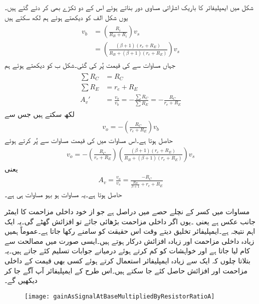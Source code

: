 شکل  میں ایمپلیفائر کا باریک اشاراتی مساوی دور بناتے ہوئے اس کے دو ٹکڑے بھی کر دئے گئے ہیں۔یوں  شکل  الف کو دیکھتے ہوئے ہم لکھ سکتے ہیں
\begin{gather}
\begin{aligned}\label{مساوات_ٹرانزسٹر_قابو_پر_برقی_دباو_کی_مساوات}
v_b&=\left(\frac{R_i}{R_B+R_i} \right) v_s\\
&=\left(\frac{\left(\beta+1 \right) \left(r_e+R_E \right)}{R_B+\left(\beta+1 \right) \left(r_e+R_E \right)} \right) v_s
\end{aligned}
\end{gather}
جہاں مساوات  سے  کی قیمت پُر کی گئی۔شکل  ب کو دیکھتے ہوئے ہم
\begin{gather}
\begin{aligned}
\sum{R_C}&=R_C\\
\sum{R_E}&=r_e+R_E\\
A_v'&=\frac{v_o}{v_b}=-\frac{\sum R_C}{\sum R_E}=-\frac{R_C}{r_e+R_E}
\end{aligned}
\end{gather}
لکھ سکتے ہیں جس سے
\begin{align}
v_o=-\left(\frac{R_C}{r_e+R_E}\right) v_b
\end{align}
حاصل ہوتا ہے۔اس مساوات میں  کی قیمت مساوات   سے پُر کرتے ہوئے
\begin{align}
v_o=-\left(\frac{R_C}{r_e+R_E}\right) \left(\frac{\left(\beta+1 \right) \left(r_e+R_E \right)}{R_B+\left(\beta+1 \right) \left(r_e+R_E \right)} \right) v_s
\end{align}
یعنی
\begin{align}\label{مساوات_ٹرانزسٹر_داخلی_مزاحمت_بالمقابل_افزائش}
A_v=\frac{v_o}{v_s}=\frac{-R_C}{\frac{R_B}{\beta+1}+r_e+R_E}
\end{align}
حاصل ہوتا ہے۔یہ مساوات ہو بہو مساوات  ہی ہے۔

مساوات  میں کسر کے نچلے  حصے میں   دراصل   ہے جو از خود  داخلی مزاحمت کا ایمٹر جانب عکس ہے یعنی ۔یوں اگر داخلی مزاحمت بڑھائی جائے تو افزائش  گھٹے گی۔یہ ایک اہم نتیجہ ہے۔ایمپلیفائر تخلیق دیتے وقت اس حقیقت کو سامنے رکھا جاتا ہے۔عموماً ہمیں زیادہ داخلی مزاحمت اور زیادہ افزائش درکار ہوتے ہیں۔ایسی صورت میں مصالحت سے کام لیا جاتا ہے اور خواہشات کو کم کرتے ہوئے درمیانے جوابات تسلیم کئے جاتے ہیں۔یہ بتلاتا چلوں کہ ایک سے زیادہ ایمپلیفائر استعمال کرتے ہوئے کسی بھی قیمت کے داخلی مزاحمت اور افزائش حاصل کئے جا سکتے ہیں۔اس طرح کے ایمپلیفائر آپ آگے جا کر دیکھیں گے۔
\begin{figure}
\centering
\texttt{[image: gainAsSignalAtBaseMultipliedByResistorRatioA]}
\caption{}
\label{شکل_ٹرانزسٹر_افزائش_کو_داخلی_مزاحمت_کی_مدد_سے_الف}
\end{figure}

